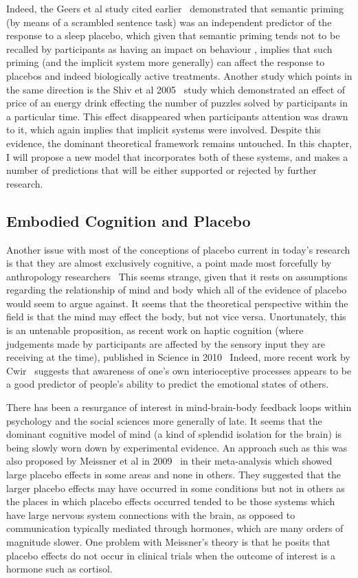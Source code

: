Indeed, the Geers et al study cited earlier~\cite{Geers2005} demonstrated that semantic priming (by means of a scrambled sentence task) was an independent predictor of the response to a sleep placebo, which given that semantic priming tends not to be recalled by participants as having an impact on behaviour \cite{Wittenbrink2007}, implies that such priming (and the implicit system more generally) can affect the response to placebos and indeed biologically active treatments. Another study which points in the same direction is the Shiv et al 2005~\cite{Shiv2005a} study which demonstrated an effect of price of an energy drink effecting the number of puzzles solved by participants in a particular time. This effect disappeared when participants attention was drawn to it, which again implies that implicit systems were involved. Despite this evidence, the dominant theoretical framework remains untouched. In this chapter, I will propose a new model that incorporates both of these systems, and makes a number of predictions that will be either supported or rejected by further research. 

\subsection{Embodied Cognition and Placebo}
\label{sec:embod-cogn-plac}
Another issue with most of the conceptions of placebo current in today's research is that they are almost exclusively cognitive, a point made most forcefully by anthropology researchers~\cite{Thompson2009}  %
This seems strange, given that it rests on assumptions regarding the relationship of mind and body which all of the evidence of placebo would seem to argue against. It seems that the theoretical perspective within the field is that the mind may effect the body, but not vice versa. Unortunately, this is an untenable proposition, as recent work on haptic cognition (where judgements made by participants are affected by the sensory input they are receiving at the time), published in Science in 2010~\cite{ackerman2010incidental}
Indeed, more recent work by Cwir~\cite{cwir2011your} suggests that awareness of one's own interioceptive processes appears to be a good predictor of people's ability to predict the emotional states of others. 


There has been a resurgance of interest in mind-brain-body feedback loops within psychology and the social sciences more generally of late. It seems that the dominant cognitive model of mind (a kind of splendid isolation for the brain) is being slowly worn down by experimental evidence. An approach such as this was also proposed by Meissner et al in 2009~\cite{Meissner2007} in their meta-analysis which showed large placebo effects in some areas and none in others. They suggested that the larger placebo effects may have occurred in some conditions but not in others as the places in which placebo effects occurred tended to be those systems which have large nervous system connections with the brain, as opposed to communication typically mediated through hormones, which are many orders of magnitude slower. One problem with Meissner's theory is that he posits that placebo effects do not occur in clinical trials when the outcome of interest is a hormone such as cortisol. 

